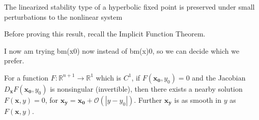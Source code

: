 \begin{proposition}[]
	The linearized stability type of a hyperbolic fixed point is preserved under small perturbations to the nonlinear system
\end{proposition}
Before proving this result, recall the Implicit Function Theorem.

{\color{blue} I now am trying bm(x0) now instead of bm(x)0, so we can decide which we prefer.}

\begin{theorem}
	For a function $F:\mathbb{R}^{n+1} \to \mathbb{R}^{1}$ which is $C^1$, if  $F( \bm{x_0} , y_0 ) = 0$ and the Jacobian $D_{\bm{x} }F(\bm{x_0} , y_0 )$ is nonsingular (invertible), then there exists a nearby solution $F(\bm{x} , y )=0 $, for $\bm{x_y} = \bm{x_0}  + \mathcal{O}(|y-y_0|)$. Further $\bm{x_y} $ is as smooth in $y$ as $F(\bm{x} ,y)$.
\end{theorem}

